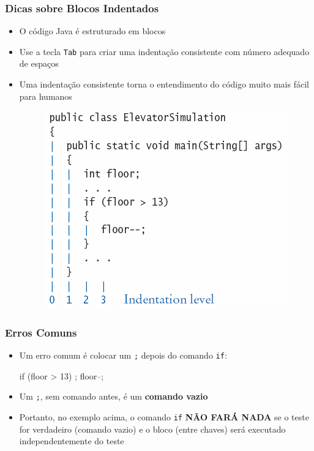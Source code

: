 \documentclass[xcolor={dvipsnames,table},aspectratio=169]{beamer}
\begin{document}
\begin{frame}\frametitle{Dicas sobre Blocos Indentados}
\begin{itemize}
	\item O código Java é estruturado em blocos
	\item Use a tecla \texttt{Tab} para criar uma indentação consistente com número adequado de espaços
	\item Uma indentação consistente torna o entendimento do código muito mais fácil para humanos
\begin{figure}[h]
	\includegraphics[height=0.45\paperheight,center]{pucrs-ep-fprog-unidade_03-decisoes-laminas-indentacao.png}
\end{figure}
\end{itemize}
\end{frame}

\begin{frame}[fragile]\frametitle{Erros Comuns}
\begin{itemize}
	\item Um erro comum é colocar um \texttt{;} depois do comando \texttt{if}:
\begin{javacode}
if (floor > 13) ;
{
   floor--;
}
\end{javacode}
	\item Um \texttt{;}, sem comando antes, é um \textbf{comando vazio}
	\item Portanto, no exemplo acima, o comando \texttt{if} \textbf{NÃO FARÁ NADA} se o teste for verdadeiro (comando vazio) e o bloco (entre chaves) será executado independentemente do teste
\end{itemize}
\end{frame}
\end{document}

